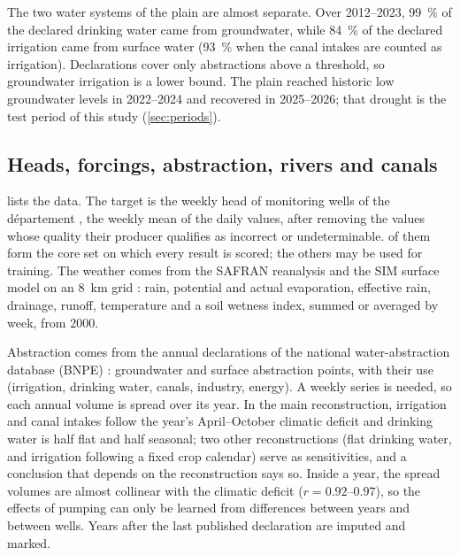 The two water systems of the plain are almost separate. Over 2012--2023, \SI{99}{\percent} of the
declared drinking water came from groundwater, while \SI{84}{\percent} of the declared irrigation
came from surface water (\SI{93}{\percent} when the canal intakes are counted as irrigation). %
Declarations cover only abstractions above a threshold, so groundwater irrigation is a lower bound.
The plain reached historic low groundwater levels in 2022--2024 and recovered in 2025--2026; that
drought is the test period of this study (\cref{sec:periods}).

\subsection{Heads, forcings, abstraction, rivers and canals}\label{sec:inputs}

 lists the data. The target is the weekly head of \nDataWells{} monitoring wells
of the d\'epartement \citep{Hubeau2026Piezometry}, the weekly mean of the daily values, after removing the
values whose quality their producer qualifies as incorrect or undeterminable. \nDataCoreWells{} of them form the core set on which every
result is scored; the others may be used for training. The weather comes from the SAFRAN reanalysis
\citep{Vidal2009A} and the SIM surface model \citep{Habets2008The} on an \SI{8}{km} grid
\citep{MeteoFrance2026Sim}: rain, potential and actual evaporation, effective rain, drainage, runoff,
temperature and a soil wetness index, summed or averaged by week, from 2000.

Abstraction comes from the annual declarations of the national water-abstraction database (BNPE)
\citep{Hubeau2026Abstraction}: \nDataGroundwaterPoints{} groundwater and \nDataSurfacePoints{} surface
abstraction points, with their use (irrigation, drinking water, canals, industry, energy). A weekly
series is needed, so each annual volume is spread over its year. In the main reconstruction,
irrigation and canal intakes follow the year's April--October climatic deficit and drinking water
is half flat and half seasonal; two other reconstructions (flat drinking water, and irrigation
following a fixed crop calendar) serve as sensitivities, and a conclusion that depends on the
reconstruction says so. Inside a year, the spread volumes are almost collinear with the climatic
deficit ($r = 0.92$--$0.97$), so the effects of pumping can only be learned from differences
between years and between wells. Years after the last published declaration are imputed and
marked.

